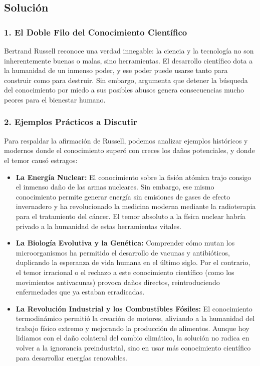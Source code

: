 \documentclass[12pt, a4paper]{article}
\begin{document}
\subsection*{Solución}

\subsubsection*{1. El Doble Filo del Conocimiento Científico}
Bertrand Russell reconoce una verdad innegable: la ciencia y la tecnología no son inherentemente buenas o malas, sino herramientas. El desarrollo científico dota a la humanidad de un inmenso poder, y ese poder puede usarse tanto para construir como para destruir. Sin embargo, argumenta que detener la búsqueda del conocimiento por miedo a sus posibles abusos genera consecuencias mucho peores para el bienestar humano.

\subsubsection*{2. Ejemplos Prácticos a Discutir}
Para respaldar la afirmación de Russell, podemos analizar ejemplos históricos y modernos donde el conocimiento superó con creces los daños potenciales, y donde el temor causó estragos:
\begin{itemize}
    \item \textbf{La Energía Nuclear:} El conocimiento sobre la fisión atómica trajo consigo el inmenso daño de las armas nucleares. Sin embargo, ese mismo conocimiento permite generar energía sin emisiones de gases de efecto invernadero y ha revolucionado la medicina moderna mediante la radioterapia para el tratamiento del cáncer. El temor absoluto a la física nuclear habría privado a la humanidad de estas herramientas vitales.
    \item \textbf{La Biología Evolutiva y la Genética:} Comprender cómo mutan los microorganismos ha permitido el desarrollo de vacunas y antibióticos, duplicando la esperanza de vida humana en el último siglo. Por el contrario, el temor irracional o el rechazo a este conocimiento científico (como los movimientos antivacunas) provoca daños directos, reintroduciendo enfermedades que ya estaban erradicadas.
    \item \textbf{La Revolución Industrial y los Combustibles Fósiles:} El conocimiento termodinámico permitió la creación de motores, aliviando a la humanidad del trabajo físico extremo y mejorando la producción de alimentos. Aunque hoy lidiamos con el daño colateral del cambio climático, la solución no radica en volver a la ignorancia preindustrial, sino en usar más conocimiento científico para desarrollar energías renovables.
\end{itemize}
\end{document}

